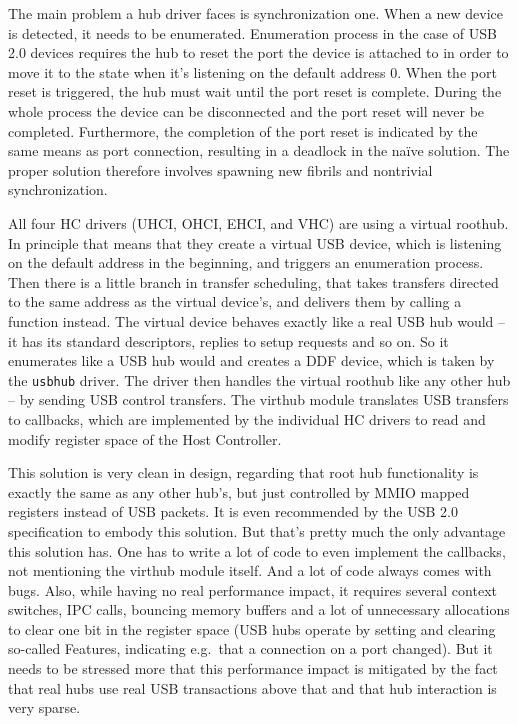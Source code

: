 The main problem a hub driver faces is synchronization one. When a new device
is detected, it needs to be enumerated. Enumeration process in the case of USB 2.0
devices requires the hub to reset the port the device is attached to in order to move
it to the  state when it's listening on the default address 0.
When the port reset is triggered, the hub must wait until the port reset is
complete. During the whole process the device can be disconnected and the
port reset will never be completed. Furthermore, the completion of the port reset
is indicated by the same means as port connection, resulting in a deadlock in
the na\"ive solution. The proper solution therefore involves spawning new
fibrils and nontrivial synchronization.

All four HC drivers (UHCI, OHCI, EHCI, and VHC) are using a virtual roothub. In
principle that means that they create a virtual USB device, which is listening
on the default address in the beginning, and triggers an enumeration process.
Then there is a little branch in transfer scheduling, that takes transfers
directed to the same address as the virtual device's, and delivers them by
calling a function instead. The virtual device behaves exactly like a real USB
hub would -- it has its standard descriptors, replies to setup requests and so
on. So it enumerates like a USB hub would and creates a DDF device, which is
taken by the \texttt{usbhub} driver. The driver then handles the virtual
roothub like any other hub -- by sending USB control transfers. The virthub
module translates USB transfers to callbacks, which are implemented by the
individual HC drivers to read and modify register space of the Host Controller.

This solution is very clean in design, regarding that root hub functionality is
exactly the same as any other hub's, but just controlled by MMIO mapped
registers instead of USB packets. It is even recommended by the USB 2.0
specification \cite{usb2} to embody this solution. But that's pretty much the only advantage
this solution has. One has to write a lot of code to even implement the
callbacks, not mentioning the virthub module itself. And a lot of code always
comes with bugs. Also, while having no real performance impact, it requires
several context switches, IPC calls, bouncing memory buffers and a lot of
unnecessary allocations to clear one bit in the register space (USB hubs
operate by setting and clearing so-called Features, indicating e.g.\ that
a connection on a port changed). But it needs to be stressed more that this
performance impact is mitigated by the fact that real hubs use real USB transactions
above that and that hub interaction is very sparse.

